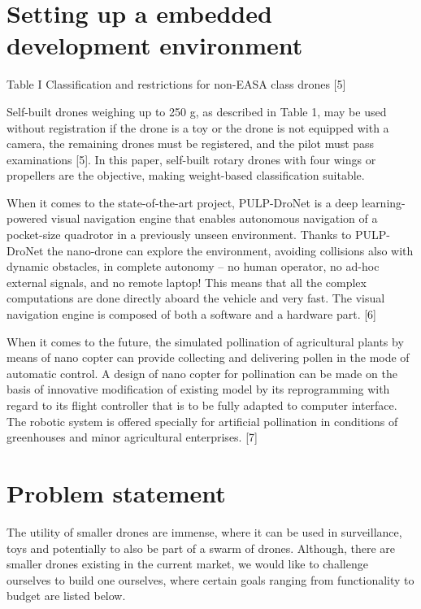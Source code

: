 \documentclass{article}
\begin{document}
 
\section{Setting up a embedded development environment}

 
\graphicspath{}
 Table I Classification and restrictions for non-EASA class drones [5] 

Self-built drones weighing up to 250 g, as described in Table 1, may be used without registration if the drone is a toy or the drone is not equipped with a camera, the remaining drones must be registered, and the pilot must pass examinations [5]. In this paper, self-built rotary drones with four wings or propellers are the objective, making weight-based classification suitable. 

When it comes to the state-of-the-art project, PULP-DroNet is a deep learning-powered visual navigation engine that enables autonomous navigation of a pocket-size quadrotor in a previously unseen environment. Thanks to PULP-DroNet the nano-drone can explore the environment, avoiding collisions also with dynamic obstacles, in complete autonomy -- no human operator, no ad-hoc external signals, and no remote laptop! This means that all the complex computations are done directly aboard the vehicle and very fast. The visual navigation engine is composed of both a software and a hardware part. [6] 

When it comes to the future, the simulated pollination of agricultural plants by means of nano copter can provide collecting and delivering pollen in the mode of automatic control. A design of nano copter for pollination can be made on the basis of innovative modification of existing model by its reprogramming with regard to its flight controller that is to be fully adapted to computer interface. The robotic system is offered specially for artificial pollination in conditions of greenhouses and minor agricultural enterprises. [7] 

 
\section{Problem statement}

The utility of smaller drones are immense, where it can be used in surveillance, toys and potentially to also be part of a swarm of drones. Although, there are smaller drones existing in the current market, we would like to challenge ourselves to build one ourselves, where certain goals ranging from functionality to budget are listed below. 
\end{document}
